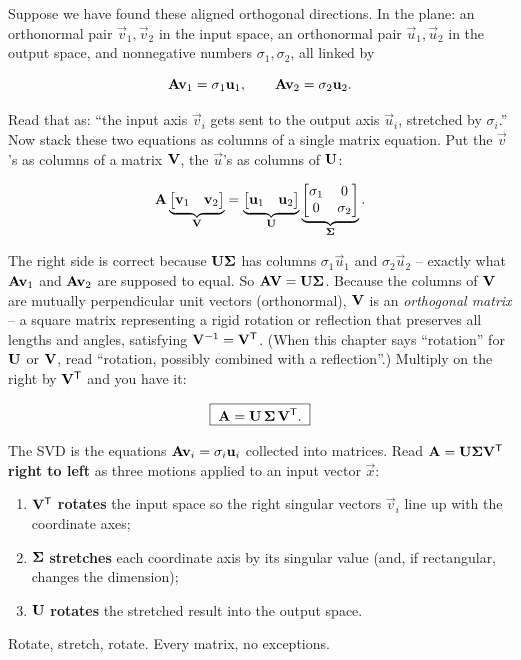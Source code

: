 Suppose we have found these aligned orthogonal directions. In the plane: an orthonormal pair
$\vec{v}_1, \vec{v}_2$ in the input space, an orthonormal pair $\vec{u}_1,
\vec{u}_2$ in the output space, and nonnegative numbers $\sigma_1, \sigma_2$, all
linked by

\[
  \mathbf{A}\mathbf{v}_1 = \sigma_1 \mathbf{u}_1, \qquad
  \mathbf{A}\mathbf{v}_2 = \sigma_2 \mathbf{u}_2.
\]

Read that as: ``the input axis $\vec{v}_i$ gets sent to the output axis
$\vec{u}_i$, stretched by $\sigma_i$.'' Now stack these two equations as columns
of a single matrix equation. Put the $\vec{v}$'s as columns of a matrix
$\mathbf{V}$, the $\vec{u}$'s as columns of $\mathbf{U}$:

\[
  \mathbf{A}\underbrace{\begin{bmatrix} \mathbf{v}_1 & \mathbf{v}_2 \end{bmatrix}}_{\mathbf{V}}
  = \underbrace{\begin{bmatrix} \mathbf{u}_1 & \mathbf{u}_2 \end{bmatrix}}_{\mathbf{U}}
    \underbrace{\begin{bmatrix} \sigma_1 & 0 \\ 0 & \sigma_2 \end{bmatrix}}_{\mathbf{\Sigma}}.
\]

The right side is correct because $\mathbf{U}\mathbf{\Sigma}$ has columns $\sigma_1
\vec{u}_1$ and $\sigma_2 \vec{u}_2$ -- exactly what $\mathbf{A}\mathbf{v}_1$ and
$\mathbf{A}\mathbf{v}_2$ are supposed to equal. So $\mathbf{A}\mathbf{V} = \mathbf{U}\mathbf{\Sigma}$.
Because the columns of $\mathbf{V}$ are mutually perpendicular unit vectors
(orthonormal), $\mathbf{V}$ is an \emph{orthogonal matrix} -- a square matrix
representing a rigid rotation or reflection that preserves all lengths and
angles, satisfying $\mathbf{V}^{-1} = \mathbf{V}^{\mathsf{T}}$. (When this chapter says
``rotation'' for $\mathbf{U}$ or $\mathbf{V}$, read ``rotation, possibly combined
with a reflection''.) Multiply on the right by
$\mathbf{V}^{\mathsf{T}}$ and you have it:

\[
  \boxed{\;\mathbf{A} = \mathbf{U}\,\mathbf{\Sigma}\,\mathbf{V}^{\mathsf{T}}.\;}
\]

\begin{focusbox}
The SVD is the equations $\mathbf{A}\mathbf{v}_i = \sigma_i \mathbf{u}_i$ collected
into matrices. Read $\mathbf{A} = \mathbf{U}\mathbf{\Sigma}\mathbf{V}^{\mathsf{T}}$ \textbf{right to
left} as three motions applied to an input vector $\vec{x}$:
\begin{enumerate}
  \item $\mathbf{V}^{\mathsf{T}}$ \textbf{rotates} the input space so the right singular vectors $\vec{v}_i$ line up with the
        coordinate axes;
  \item $\mathbf{\Sigma}$ \textbf{stretches} each coordinate axis by its singular
        value (and, if rectangular, changes the dimension);
  \item $\mathbf{U}$ \textbf{rotates} the stretched result into the output space.
\end{enumerate}
Rotate, stretch, rotate. Every matrix, no exceptions.
\end{focusbox}

